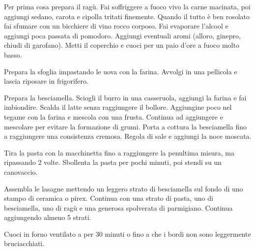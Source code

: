 \begin{method}
Per prima cosa prepara il ragù. Fai soffriggere a fuoco vivo la carne macinata, poi aggiungi sedano, carota e cipolla tritati finemente. Quando il tutto è ben rosolato fai sfumare con un bicchiere di vino rocco corposo. Fai evaporare l'alcool e aggiungi poca passata di pomodoro. Aggiungi eventuali aromi (alloro, ginepro, chiudi di garofano). Metti il coperchio e cuoci per un paio d'ore a fuoco molto basso.

Prepara la sfoglia impastando le uova con la farina. Avvolgi in una pellicola e lascia riposare in frigorifero.

Prepara la besciamella. Sciogli il burro in una casseruola, aggiungi la farina e fai imbiondire. Scalda il latte senza raggiungere il bollore. Aggiungine poco nel tegame con la farina e mescola con una frusta. Continua ad aggiungere e mescolare per evitare la formazione di grumi. Porta a cottura la besciamella fino a raggiungere una consistenza cremosa. Regola di sale e aggiungi la noce moscata.

Tira la pasta con la macchinetta fino a raggiungere la penultima misura, ma ripassando 2 volte. Sbollenta la pasta per pochi minuti, poi stendi su un canovaccio.

Assembla le lasagne mettendo un leggero strato di besciamella sul fondo di uno stampo di ceramica o pirex. Continua con una strato di pasta, uno di besciamella, uno di ragù e una generosa spolverata di parmigiano. Continua aggiungendo almeno 5 strati.

Cuoci in forno ventilato a  per 30 minuti o fino a che i bordi non sono leggermente bruciacchiati.


\end{method}





